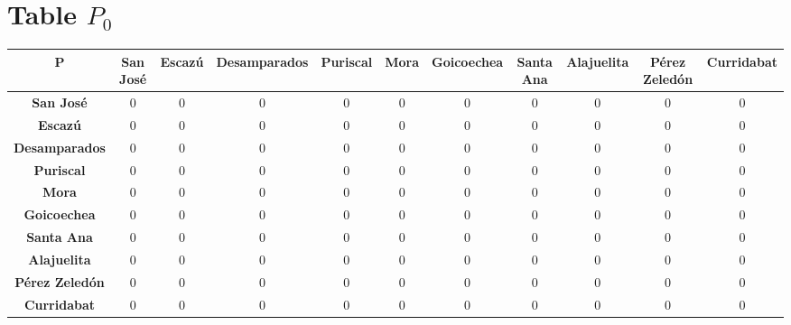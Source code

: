 \documentclass{article}
\begin{document}
\section{Table $P_{0}$}
\begin{center}
    \begin{tabular}{|c||c|c|c|c|c|c|c|c|c|c|}
        \hline
        \textbf{P} & \textbf{San José} & \textbf{Escazú} & \textbf{Desamparados} & \textbf{Puriscal} & \textbf{Mora} & \textbf{Goicoechea} & \textbf{Santa Ana} & \textbf{Alajuelita} & \textbf{Pérez Zeledón} & \textbf{Curridabat} \\
        \hline
        \hline
        \textbf{San José}& 0 & 0 & 0 & 0 & 0 & 0 & 0 & 0 & 0 & 0 \\
        \hline
        \textbf{Escazú}& 0 & 0 & 0 & 0 & 0 & 0 & 0 & 0 & 0 & 0 \\
        \hline
        \textbf{Desamparados}& 0 & 0 & 0 & 0 & 0 & 0 & 0 & 0 & 0 & 0 \\
        \hline
        \textbf{Puriscal}& 0 & 0 & 0 & 0 & 0 & 0 & 0 & 0 & 0 & 0 \\
        \hline
        \textbf{Mora}& 0 & 0 & 0 & 0 & 0 & 0 & 0 & 0 & 0 & 0 \\
        \hline
        \textbf{Goicoechea}& 0 & 0 & 0 & 0 & 0 & 0 & 0 & 0 & 0 & 0 \\
        \hline
        \textbf{Santa Ana}& 0 & 0 & 0 & 0 & 0 & 0 & 0 & 0 & 0 & 0 \\
        \hline
        \textbf{Alajuelita}& 0 & 0 & 0 & 0 & 0 & 0 & 0 & 0 & 0 & 0 \\
        \hline
        \textbf{Pérez Zeledón}& 0 & 0 & 0 & 0 & 0 & 0 & 0 & 0 & 0 & 0 \\
        \hline
        \textbf{Curridabat}& 0 & 0 & 0 & 0 & 0 & 0 & 0 & 0 & 0 & 0 \\
        \hline
    \end{tabular}
\end{center}
\end{document}
